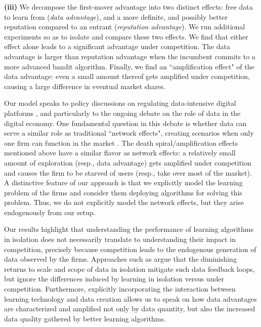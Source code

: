 \documentclass[10pt]{article}
\begin{document}
\textbf{(iii)}
We decompose the first-mover advantage into two distinct effects: free data to learn from (\emph{data advantage}), and a more definite, and possibly better reputation compared to an entrant (\emph{reputation advantage}). We run additional experiments so as to isolate and compare these two effects. We find that either effect alone leads to a significant advantage under competition. The data advantage is larger than reputation advantage when the incumbent commits to a more advanced bandit algorithm. Finally, we find an ``amplification effect" of the data advantage: even a small amount thereof gets amplified under competition, causing a large difference in eventual market shares.


Our model speaks to policy discussions on regulating data-intensive digital platforms \citep{furman2019unlocking, scott2019committee}, and particularly to the ongoing debate on the role of data in the digital economy. One fundamental question in this debate is whether data can serve a similar role as traditional ``network effects", creating scenarios when only one firm can function in the market \citep{Rysman09, jullien2019economics}.
The death spiral/amplification effects mentioned above have a similar flavor as network effects: a relatively small amount of exploration (resp., data advantage)  gets amplified under competition and causes the firm to be starved of users (resp., take over most of the market).
A distinctive feature of our approach is that we explicitly model the learning problem of the firms and consider them deploying algorithms for solving this problem.  Thus, we do not explicitly model the network effects, but they arise endogenously from our setup.

Our results highlight that understanding the performance of learning algorithms in isolation does not necessarily translate to understanding their impact in competition, precisely because competition leads to the endogenous generation of data observed by the firms. Approaches such as \citet{lambrecht2015can, bajari2018impact, varian2018artificial} argue that the diminishing returns to scale and scope of data in isolation mitigate such data feedback loops,
but ignore the differences induced by learning in isolation versus under competition. Furthermore, explicitly incorporating the interaction between learning technology and data creation allows us to speak on how data advantages are characterized and amplified not only by data quantity, but also the increased data quality gathered by better learning algorithms.
\end{document}
